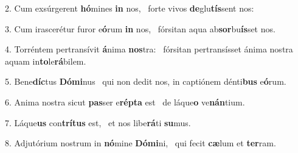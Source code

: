 2. Cum exsúrgerent \textbf{hó}mines \textbf{in} nos, \ast\  forte vivos \textbf{de}glu\textbf{tís}sent nos:\

3. Cum irascerétur furor e\textbf{ó}rum \textbf{in} nos, \ast\  fórsitan aqua ab\textbf{sor}bu\textbf{ís}set nos.\

4. Torréntem pertransívit \textbf{á}nima \textbf{nos}tra: \ast\  fórsitan pertransísset ánima nostra aquam in\textbf{to}le\textbf{rá}bilem.\

5. Bene\textbf{díc}tus \textbf{Dó}\textbf{mi}nus \ast\  qui non dedit nos, in captiónem dénti\textbf{bus} e\textbf{ó}rum.\

6. Anima nostra sicut \textbf{pas}ser e\textbf{rép}\textbf{ta} est \ast\  de láque\textbf{o} ve\textbf{nán}tium.\

7. Láque\textbf{us} con\textbf{trí}\textbf{tus} est, \ast\  et nos libe\textbf{rá}ti \textbf{su}mus.\

8. Adjutórium nostrum in \textbf{nó}mine \textbf{Dó}\textbf{mi}ni, \ast\  qui fecit \textbf{cæ}lum et \textbf{ter}ram.\


